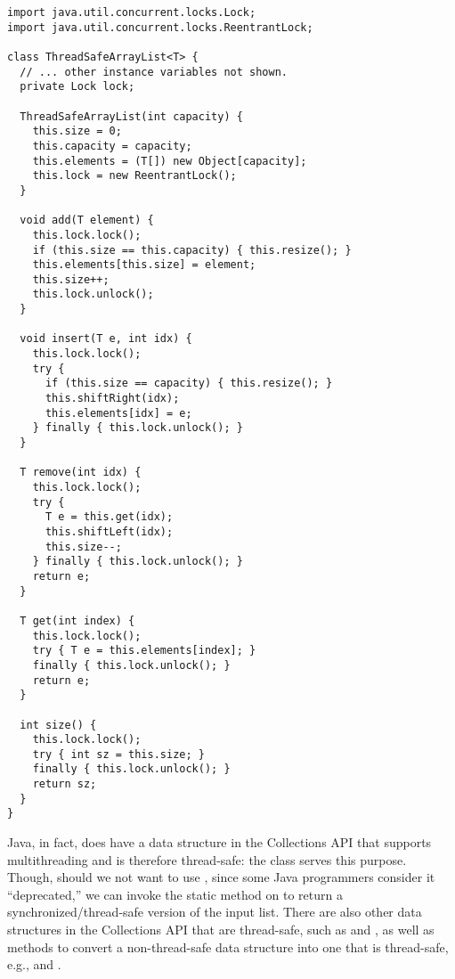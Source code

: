 \begin{lstlisting}[language=MyJava]
import java.util.concurrent.locks.Lock;
import java.util.concurrent.locks.ReentrantLock;

class ThreadSafeArrayList<T> {
  // ... other instance variables not shown.
  private Lock lock;

  ThreadSafeArrayList(int capacity) {
    this.size = 0;
    this.capacity = capacity;
    this.elements = (T[]) new Object[capacity];
    this.lock = new ReentrantLock();
  }

  void add(T element) {
    this.lock.lock();
    if (this.size == this.capacity) { this.resize(); }
    this.elements[this.size] = element;
    this.size++;
    this.lock.unlock();
  }

  void insert(T e, int idx) {
    this.lock.lock();
    try {
      if (this.size == capacity) { this.resize(); }
      this.shiftRight(idx);
      this.elements[idx] = e;
    } finally { this.lock.unlock(); }
  }

  T remove(int idx) {
    this.lock.lock();
    try {
      T e = this.get(idx);
      this.shiftLeft(idx);
      this.size--;
    } finally { this.lock.unlock(); }
    return e;
  }

  T get(int index) {
    this.lock.lock();
    try { T e = this.elements[index]; }
    finally { this.lock.unlock(); }
    return e;
  }

  int size() {
    this.lock.lock();
    try { int sz = this.size; }
    finally { this.lock.unlock(); }
    return sz;
  }
}
\end{lstlisting}

Java, in fact, does have a data structure in the Collections API that supports multithreading and is therefore thread-safe: the  class serves this purpose. Though, should we not want to use , since some Java programmers consider it ``deprecated,'' we can invoke the static  method on  to return a synchronized/thread-safe version of the input list. There are also other data structures in the Collections API that are thread-safe, such as  and , as well as methods to convert a non-thread-safe data structure into one that is thread-safe, e.g.,  and .


